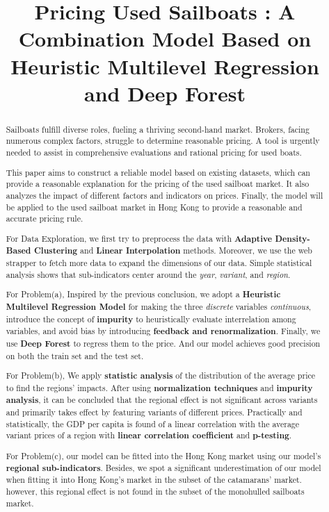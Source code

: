 \documentclass[12pt]{article}  %
\title{Pricing Used Sailboats : A Combination Model Based on Heuristic Multilevel Regression and Deep Forest}  %
\begin{document}
\begin{abstract}
    Sailboats fulfill diverse roles, fueling a thriving second-hand market. 
    Brokers, facing numerous complex factors, struggle to determine reasonable pricing. 
    A tool is urgently needed to assist in comprehensive evaluations and rational pricing for used boats.

    This paper aims to construct a reliable model based on existing datasets, 
    which can provide a reasonable explanation for the pricing of the used sailboat market. 
    It also analyzes the impact of different factors and indicators on prices. 
    Finally, the model will be applied to the used sailboat market in Hong Kong to provide a reasonable and accurate pricing rule.

    For Data Exploration, we first try to preprocess the data with \textbf{Adaptive Density-Based Clustering} and \textbf{Linear Interpolation} methods.
    Moreover, we use the web strapper to fetch more data to expand the dimensions of our data. Simple statistical analysis shows that sub-indicators center around the \emph{year}, \emph{variant}, and \emph{region}.
    
    For Problem(a), Inspired by the previous conclusion, we adopt a \textbf{Heuristic Multilevel Regression Model} for making the three \emph{discrete} variables \emph{continuous}, introduce the concept of \textbf{impurity} to heuristically evaluate interrelation among variables, and avoid bias by introducing \textbf{feedback and renormalization}. Finally, we use \textbf{Deep Forest} to regress them to the price.
    And our model achieves good precision on both the train set and the test set.

    For Problem(b), 
    We apply \textbf{statistic analysis} of the distribution of the average price to find the regions' impacts.
    After using \textbf{normalization techniques} and \textbf{impurity analysis}, it can be concluded that the regional effect is not significant across variants and primarily takes effect by featuring variants of different prices.
    Practically and statistically, the GDP per capita is found of a linear correlation with the average variant prices of a region with \textbf{linear correlation coefficient} and \textbf{p-testing}.

    For Problem(c),
    our model can be fitted into the Hong Kong market using our model's \textbf{regional sub-indicators}.
    Besides, we spot a significant underestimation of our model when fitting it into Hong Kong's market in the subset of the catamarans' market.
    however, this regional effect is not found in the subset of the monohulled sailboats market. 
    

\end{abstract}
\end{document}
